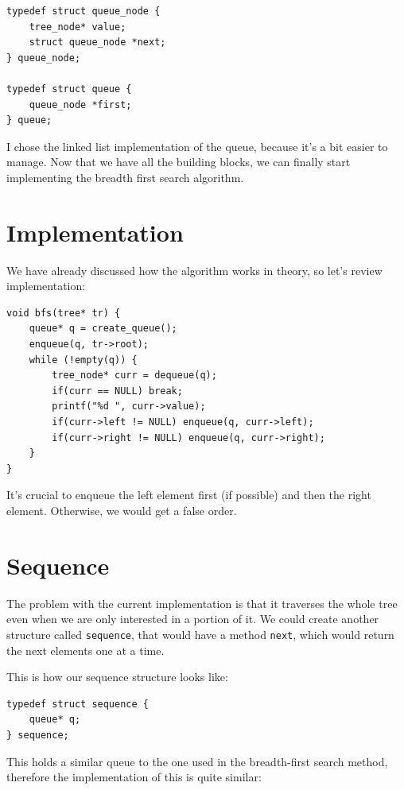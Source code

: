 \documentclass[a4paper,11pt]{article}
\begin{document}
    \begin{verbatim}
typedef struct queue_node {
    tree_node* value;
    struct queue_node *next;
} queue_node;

typedef struct queue {
    queue_node *first;
} queue;        
    \end{verbatim}

    I chose the linked list implementation of the queue, because it's a bit easier to manage.
    Now that we have all the building blocks, we can finally start implementing the breadth first search algorithm.

    \section*{Implementation}

    We have already discussed how the algorithm works in theory, so let's review implementation:
    \begin{verbatim}
void bfs(tree* tr) {
    queue* q = create_queue();
    enqueue(q, tr->root);
    while (!empty(q)) {
        tree_node* curr = dequeue(q);
        if(curr == NULL) break;
        printf("%d ", curr->value);
        if(curr->left != NULL) enqueue(q, curr->left);
        if(curr->right != NULL) enqueue(q, curr->right);
    }
}  
    \end{verbatim}

    It's crucial to enqueue the left element first (if possible) and then the right element.
    Otherwise, we would get a false order.

    \section*{Sequence}

    The problem with the current implementation is that it traverses the whole tree even when we are only interested in a portion of it.
    We could create another structure called {\tt sequence}, that would have a method {\tt next}, which would return the next elements one at a time.
    
    This is how our sequence structure looks like:

    \begin{verbatim}
typedef struct sequence {
    queue* q;
} sequence;
    \end{verbatim}

    This holds a similar queue to the one used in the breadth-first search method, therefore the implementation of this is quite similar:
\end{document}
